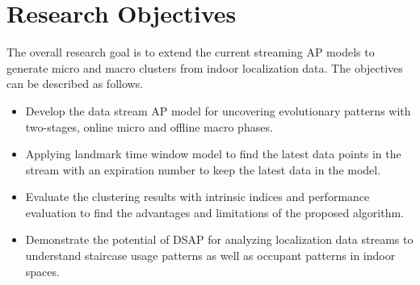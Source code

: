 








\section{Research Objectives}

The overall research goal is to extend the current streaming AP models to generate micro and macro clusters from indoor localization data. The objectives can be described as follows. 

\begin{itemize}

    \item Develop the data stream AP model for uncovering evolutionary patterns with two-stages, online micro and offline macro phases.
     \item Applying landmark time window model to find the latest data points in the stream with an expiration number to keep the latest data in the model.
    \item Evaluate the clustering results with intrinsic indices and performance evaluation to find the advantages and limitations of the proposed algorithm.  
    \item Demonstrate the potential of DSAP for analyzing localization data streams to understand staircase usage patterns as well as occupant patterns in indoor spaces.
\end{itemize}  

